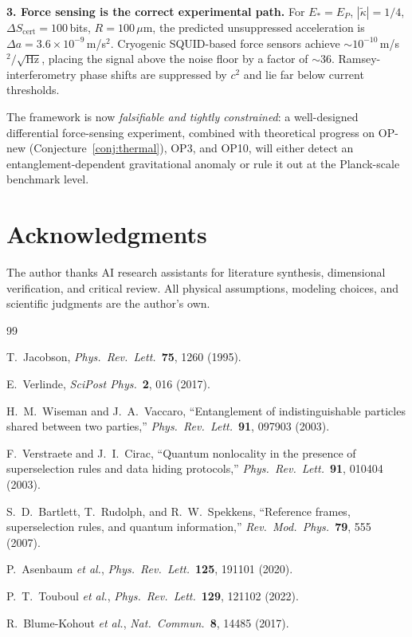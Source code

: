\documentclass[11pt]{article}
\theoremstyle{plain}
\theoremstyle{definition}
\theoremstyle{remark}
\begin{document}
\textbf{3. Force sensing is the correct experimental path.}
For $E_* = E_P$, $|\tilde{\kappa}| = 1/4$, $\Delta S_{\mathrm{cert}} = 100$\,bits,
$R = 100\,\mu$m, the predicted unsuppressed acceleration is
$\Delta a = 3.6\times10^{-9}$\,m/s$^2$.  Cryogenic SQUID-based force sensors
achieve $\sim10^{-10}$\,m/s$^2/\sqrt{\mathrm{Hz}}$, placing the signal above the
noise floor by a factor of $\sim\!36$.  Ramsey-interferometry phase shifts are
suppressed by $c^2$ and lie far below current thresholds.

The framework is now \emph{falsifiable and tightly constrained}: a well-designed
differential force-sensing experiment, combined with theoretical progress on
OP-new (Conjecture~\ref{conj:thermal}), OP3, and OP10, will either detect an
entanglement-dependent gravitational anomaly or rule it out at the Planck-scale
benchmark level.

\section*{Acknowledgments}
The author thanks AI research assistants for literature synthesis, dimensional
verification, and critical review.  All physical assumptions, modeling choices,
and scientific judgments are the author's own.

\begin{thebibliography}{99}

T.~Jacobson, \textit{Phys.\ Rev.\ Lett.}\ \textbf{75}, 1260 (1995).

E.~Verlinde, \textit{SciPost Phys.}\ \textbf{2}, 016 (2017).

H.~M.~Wiseman and J.~A.~Vaccaro,
``Entanglement of indistinguishable particles shared between two parties,''
\textit{Phys.\ Rev.\ Lett.}\ \textbf{91}, 097903 (2003).

F.~Verstraete and J.~I.~Cirac,
``Quantum nonlocality in the presence of superselection rules and data hiding protocols,''
\textit{Phys.\ Rev.\ Lett.}\ \textbf{91}, 010404 (2003).

S.~D.~Bartlett, T.~Rudolph, and R.~W.~Spekkens,
``Reference frames, superselection rules, and quantum information,''
\textit{Rev.\ Mod.\ Phys.}\ \textbf{79}, 555 (2007).

P.~Asenbaum \textit{et al.}, \textit{Phys.\ Rev.\ Lett.}\ \textbf{125}, 191101 (2020).

P.~T.~Touboul \textit{et al.}, \textit{Phys.\ Rev.\ Lett.}\ \textbf{129}, 121102 (2022).

R.~Blume-Kohout \textit{et al.}, \textit{Nat.\ Commun.}\ \textbf{8}, 14485 (2017).

\end{thebibliography}
\end{document}
